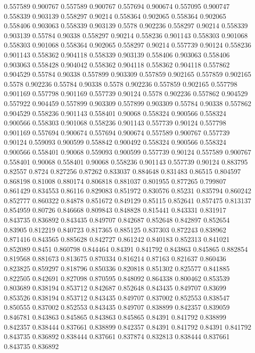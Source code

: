 0.557589 0.900767
0.557589 0.900767
0.557694 0.900674
0.557095 0.900747
0.558339 0.903139
0.558297 0.90214
0.558364 0.902065
0.558364 0.902065
0.558406 0.903063
0.558339 0.903139
0.5578 0.902236
0.558297 0.90214
0.558339 0.903139
0.55784 0.90338
0.558297 0.90214
0.558236 0.901143
0.558303 0.901068
0.558303 0.901068
0.558364 0.902065
0.558297 0.90214
0.557739 0.90124
0.558236 0.901143
0.558362 0.904118
0.558339 0.903139
0.558406 0.903063
0.558406 0.903063
0.558428 0.904042
0.558362 0.904118
0.558362 0.904118
0.557862 0.904529
0.55784 0.90338
0.557899 0.903309
0.557859 0.902165
0.557859 0.902165
0.5578 0.902236
0.55784 0.90338
0.5578 0.902236
0.557859 0.902165
0.557798 0.901169
0.557798 0.901169
0.557739 0.90124
0.5578 0.902236
0.557862 0.904529
0.557922 0.904459
0.557899 0.903309
0.557899 0.903309
0.55784 0.90338
0.557862 0.904529
0.558236 0.901143
0.558401 0.90068
0.558324 0.900566
0.558324 0.900566
0.558303 0.901068
0.558236 0.901143
0.557739 0.90124
0.557798 0.901169
0.557694 0.900674
0.557694 0.900674
0.557589 0.900767
0.557739 0.90124
0.559093 0.900599
0.558842 0.900492
0.558324 0.900566
0.558324 0.900566
0.558401 0.90068
0.559093 0.900599
0.557739 0.90124
0.557589 0.900767
0.558401 0.90068
0.558401 0.90068
0.558236 0.901143
0.557739 0.90124
0.883795 0.82557
0.8724 0.827256
0.87262 0.833037
0.884648 0.831483
0.86515 0.804597
0.868198 0.81008
0.880174 0.806818
0.881037 0.801955
0.877265 0.799807
0.861429 0.834553
0.86116 0.829083
0.851972 0.830576
0.85231 0.835794
0.860242 0.852777
0.860322 0.84878
0.851672 0.849129
0.85115 0.852641
0.857475 0.813137
0.854959 0.80726
0.846668 0.809843
0.848828 0.815441
0.843331 0.831917
0.843735 0.836892
0.843435 0.849707
0.842687 0.852648
0.842897 0.852654
0.83905 0.812219
0.840723 0.817365
0.885125 0.837303
0.872243 0.838962
0.871416 0.843565
0.885628 0.842727
0.861242 0.840183
0.852313 0.841021
0.852089 0.8451
0.860798 0.844464
0.84391 0.841792
0.843863 0.845865
0.882854 0.819568
0.881673 0.813675
0.870334 0.816214
0.87163 0.821637
0.860436 0.823825
0.859297 0.818796
0.850336 0.820818
0.851302 0.825577
0.841885 0.822505
0.842691 0.827098
0.870595 0.848092
0.864338 0.800462
0.853539 0.803689
0.838194 0.853712
0.842687 0.852648
0.843435 0.849707
0.83699 0.853526
0.838194 0.853712
0.843435 0.849707
0.837002 0.852553
0.838547 0.850555
0.837002 0.852553
0.843435 0.849707
0.838899 0.842357
0.839059 0.846781
0.843863 0.845865
0.843863 0.845865
0.84391 0.841792
0.838899 0.842357
0.838444 0.837661
0.838899 0.842357
0.84391 0.841792
0.84391 0.841792
0.843735 0.836892
0.838444 0.837661
0.837874 0.832813
0.838444 0.837661
0.843735 0.836892
